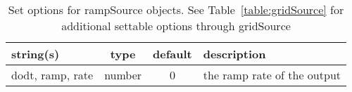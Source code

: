 \begin{table}[ht]
\centering
\begin{tabular}{p{5cm} c c p{7cm}}
\hline
string(s) & type & default & description \\
\hline
dodt, ramp, rate & number & 0 & the ramp rate of the output\\
\hline
\end{tabular}
\caption{Set options for rampSource objects. See Table~\ref{table:gridSource} for additional settable options through gridSource}
\label{table:rampSource}
\end{table}
